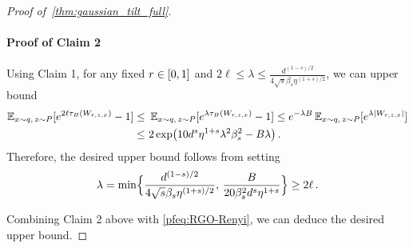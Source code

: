 \begin{proof}[Proof of~\cref{thm:gaussian_tilt_full}]
\paragraph{Proof of Claim 2}
Using Claim 1, for any fixed $\lr\in[0,1]$ and $2\ell\leq \lambda\leq \frac{d^{(1-s)/2}}{4\sqrt{s}\beta_s\eta^{(1+s)/2}}$, we can upper bound
\begin{align*}
    \En_{x\sim q,\, z\sim P}\brk{e^{2\ell\trunc{W_{r,z,x}}}-1}
    \leq&~ \En_{x\sim q,\, z\sim P}\brk{e^{\lambda \trunc{W_{r,z,x}}}-1}
    \leq e^{-\lambda B} \En_{x\sim q,\, z\sim P}\brk{e^{\lambda\abs{W_{r,z,x}}}} \\
    \leq&~ 2\exp\prn*{10d^s\eta^{1+s}\lambda^2\beta_s^2-B\lambda}\,.
\end{align*}
Therefore, the desired upper bound follows from setting
\begin{align*}
    \lambda=\min\crl[\Big]{\frac{d^{(1-s)/2}}{4\sqrt{s}\beta_s\eta^{(1+s)/2}},\, \frac{B}{20\beta_s^2d^s\eta^{1+s}}}\geq 2\ell\,.
\end{align*}

Combining Claim 2 above with \cref{pfeq:RGO-Renyi}, we can deduce the desired upper bound.
\end{proof}


